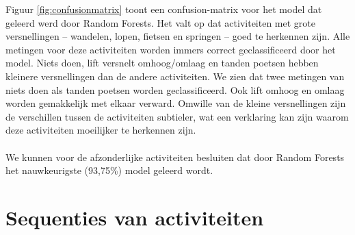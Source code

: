 \documentclass{article}
\begin{document}
Figuur \ref{fig:confusionmatrix} toont een confusion-matrix voor het model dat geleerd werd door Random Forests. Het valt op dat activiteiten met grote versnellingen -- wandelen, lopen, fietsen en springen -- goed te herkennen zijn. Alle metingen voor deze activiteiten worden immers correct geclassificeerd door het model. Niets doen, lift versnelt omhoog/omlaag en tanden poetsen hebben kleinere versnellingen dan de andere activiteiten. We zien dat twee metingen van niets doen als tanden poetsen worden geclassificeerd. Ook lift omhoog en omlaag worden gemakkelijk met elkaar verward. Omwille van de kleine versnellingen zijn de verschillen tussen de activiteiten subtieler, wat een verklaring kan zijn waarom deze activiteiten moeilijker te herkennen zijn.
\\~\\
We kunnen voor de afzonderlijke activiteiten besluiten dat door Random Forests het nauwkeurigste (93,75\%) model geleerd wordt.


\section{Sequenties van activiteiten}
\end{document}

